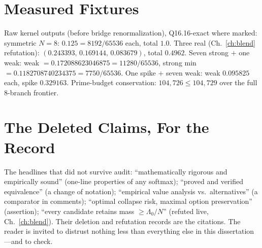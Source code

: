 \documentclass[12pt,oneside]{report}
\theoremstyle{plain}
\theoremstyle{definition}
\theoremstyle{remark}
\begin{document}
\chapter{Measured Fixtures}
\label{app:fixtures}

Raw kernel outputs (before bridge renormalization), Q16.16-exact where
marked: symmetric $N{=}8$: $0.125=8192/65536$ each, total $1.0$. Three
real (Ch.~\ref{ch:blend} refutation): $(0.243393,\,0.169144,\,
0.083679)$, total $0.4962$. Seven strong $+$ one weak:
weak $=0.172088623046875=11280/65536$, strong min
$=0.1182708740234375=7750/65536$. One spike $+$ seven weak: weak
$0.095825$ each, spike $0.329163$. Prime-budget conservation:
$104{,}726\le104{,}729$ over the full $8$-branch frontier.

\chapter{The Deleted Claims, For the Record}
\label{app:deleted}

The headlines that did not survive audit: ``mathematically rigorous and
empirically sound'' (one-line properties of any softmax); ``proved and
verified equivalence'' (a change of notation); ``empirical value
analysis vs.\ alternatives'' (a comparator in comments); ``optimal
collapse risk, maximal option preservation'' (assertion); ``every
candidate retains mass $\ge\Lambda_0/N$'' (refuted live,
Ch.~\ref{ch:blend}). Their deletion and refutation records are the
citations. The reader is invited to distrust nothing less than
everything else in this dissertation---and to check.
\end{document}
